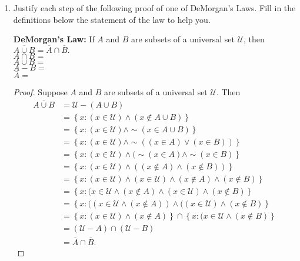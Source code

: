 \documentclass[12 pt]{article}
\newcommand{\set}[1]{\left\{#1\right\}}
\newcommand{\ds}{\displaystyle}
\renewcommand{\c}[1]{\overline{#1}}
\theoremstyle{definition}
\theoremstyle{plain}
\theoremstyle{mytheorem}
\theoremstyle{myexample}
\theoremstyle{mydefinition}
\begin{document}
\begin{enumerate}[resume]

\item Justify each step of the following proof of one of DeMorgan's Laws.  Fill in the definitions below the statement of the law to help you.

\noindent \textbf{DeMorgan's Law:}  If $A$ and $B$ are subsets of a universal set $\mathcal{U}$, then $\c{A \cup B} = \c{A} \cap \c{B}.$\\

$\ds A \cap B = $ \\[.2in]

$\ds A \cup B = $ \\[.2in]

$\ds A - B = $\\[.2in]

$\c{A} = $
\begin{proof}  Suppose $A$ and $B$ are subsets of a universal set $\mathcal{U}$.  Then
\begingroup
\addtolength{\jot}{2.5em}
	\begin{align*}
	\c{A \cup B} &= \mathcal{U} - (A \cup B) \\
	\ &= \set{x: (x \in \mathcal{U}) \wedge (x \notin A \cup B)}\\
	\ &= \set{x: (x \in \mathcal{U}) \wedge \sim (x \in A \cup B)}\\
	\ &= \set{x: (x \in \mathcal{U}) \wedge \sim ( (x \in A) \vee (x \in B))}\\
	\ &= \set{x: (x \in \mathcal{U}) \wedge (\sim (x \in A) \wedge \sim (x \in B)}\\
	\ &= \set{x: (x \in \mathcal{U}) \wedge ((x \notin A) \wedge (x \notin B))}\\
	\ &= \set{x: (x \in \mathcal{U}) \wedge (x \in \mathcal{U}) \wedge (x \notin A) \wedge (x \notin B)}\\
	\ &= \set{x: (x \in \mathcal{U} \wedge (x \notin A) \wedge (x \in \mathcal{U}) \wedge (x \notin B)}\\
	\ &= \set{x: ((x \in \mathcal{U} \wedge (x \notin A)) \wedge ((x \in \mathcal{U}) \wedge (x \notin B)}\\
	\ &= \set{x: (x\in \mathcal{U}) \wedge (x \notin A)} \cap \set{x : (x \in \mathcal{U} \wedge (x \notin B)}\\
	\ &= (\mathcal{U}-A) \cap (\mathcal{U}-B)\\
	\ &= \c{A} \cap \c{B}.
	\end{align*}
	\endgroup
\end{proof}
\end{enumerate}
\end{document}
